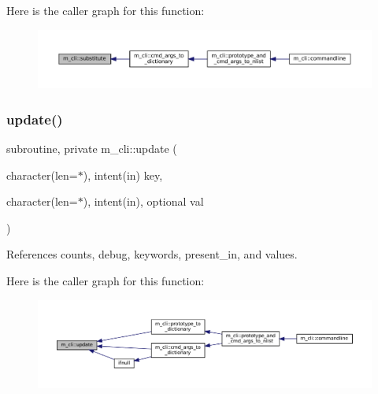 Here is the caller graph for this function\+:
\nopagebreak
\begin{figure}[H]
\begin{center}
\leavevmode
\includegraphics[width=350pt]{namespacem__cli_a3b66fe9cee0e084068051636afb2957d_icgraph}
\end{center}
\end{figure}
\mbox{\label{namespacem__cli_a9b7676d796e5cb878ecd9294b8a689cb}} 
\subsubsection{\texorpdfstring{update()}{update()}}
{\footnotesize\ttfamily subroutine, private m\+\_\+cli\+::update (\begin{DoxyParamCaption}\item[{character(len=$\ast$), intent(in)}]{key,  }\item[{character(len=$\ast$), intent(in), optional}]{val }\end{DoxyParamCaption})\hspace{0.3cm}{\ttfamily [private]}}



References counts, debug, keywords, present\+\_\+in, and values.

Here is the caller graph for this function\+:
\nopagebreak
\begin{figure}[H]
\begin{center}
\leavevmode
\includegraphics[width=350pt]{namespacem__cli_a9b7676d796e5cb878ecd9294b8a689cb_icgraph}
\end{center}
\end{figure}
\mbox{\label{namespacem__cli_aef6f54c9cb37251dfd664c0845186a40}} 
